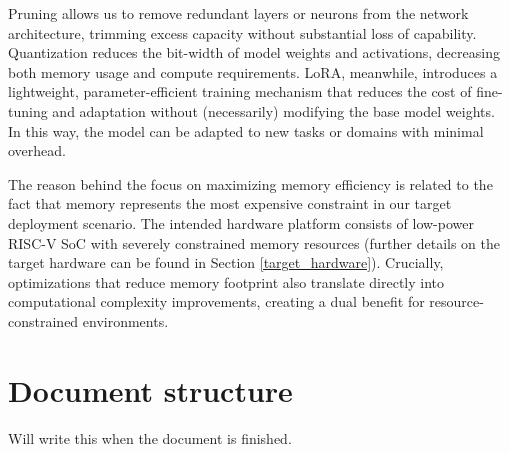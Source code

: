 Pruning allows us to remove redundant layers or neurons from the network architecture, trimming excess capacity without substantial loss of capability. Quantization reduces the bit-width of model weights and activations, decreasing both memory usage and compute requirements. LoRA, meanwhile, introduces a lightweight, parameter-efficient training mechanism that reduces the cost of fine-tuning and adaptation without (necessarily) modifying the base model weights. In this way, the model can be adapted to new tasks or domains with minimal overhead.

The reason behind the focus on maximizing memory efficiency is related to the fact that memory represents the most expensive constraint in our target deployment scenario. The intended hardware platform consists of low-power  RISC-V SoC with severely constrained memory resources (further details on the target hardware can be found in Section \ref{target_hardware}). Crucially, optimizations that reduce memory footprint also translate directly into computational complexity improvements, creating a dual benefit for resource-constrained environments.

\section{Document structure}
Will write this when the document is finished.